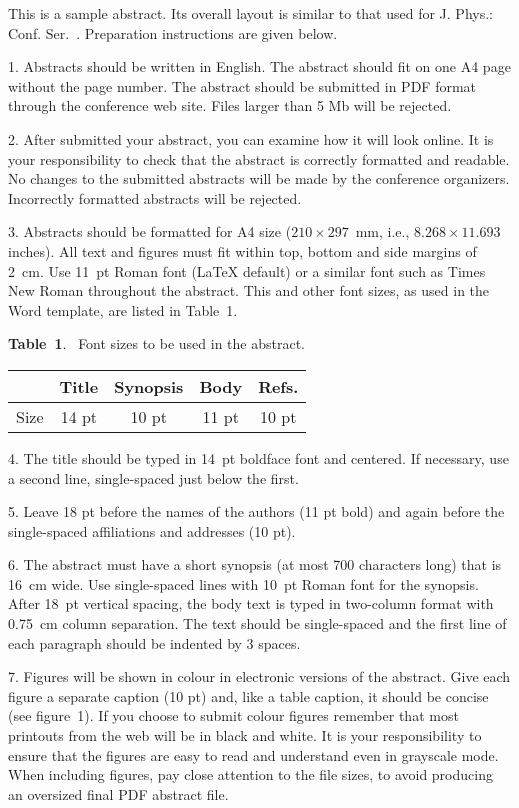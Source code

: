 \documentclass[a4paper,11pt]{article}
\newcommand{\abstracttext}[1]{
 \vspace*{-0.3cm}
 \columnsep0.75cm
 \begin{multicols}{2} #1 \end{multicols}
}
\newcommand{\captTab}[2]{
 \vspace*{-0.1cm}
 \begin{center}
 \begin{minipage}[t]{7.8cm} {\small {\bf Table~#1}.~ #2} \end{minipage}
 \end{center}
 \vspace*{0.1cm}
}
\begin{document}
\abstracttext{This is a sample abstract. Its overall
layout is similar to that used for J. Phys.: Conf. Ser.~\cite{diaz09}. 
Preparation instructions are given below.

1. Abstracts should be written in English. The abstract should fit on
one A4 page without the page number. The abstract should be submitted in PDF
format through the conference web site. Files larger than 5 Mb will be rejected.

2. After submitted your abstract, you can examine how it will look
online. It is your responsibility to check that the abstract is
correctly formatted and readable. No changes to the submitted
abstracts will be made by the conference organizers. Incorrectly
formatted abstracts will be rejected.

3. Abstracts should be formatted for A4 size ($210\times 297$~mm,
i.e., $8.268\times 11.693$ inches). All text and figures must fit
within top, bottom and side margins of 2~cm. Use 11~pt Roman font
(LaTeX default) or a similar font such as Times New Roman throughout
the abstract. This and other font sizes, as used in the Word
template, are listed in Table~1.




\begin{center}
\captTab{1}{Font sizes to be used in the abstract.}
\begin{tabular}[b]{lcccc}
\hline
   & Title & Synopsis & Body & Refs. \\
\hline
Size & 14 pt & 10 pt & 11 pt & 10 pt \\
\hline
\end{tabular}
\end{center}

4. The title should be typed in 14~pt boldface font and centered.
If necessary, use a second line, single-spaced just below the first.

5. Leave 18 pt before the names of the authors (11 pt bold) and again before
the single-spaced affiliations and addresses (10 pt).

6. The abstract must have a short synopsis (at most 700 characters long)
that is 16~cm wide. Use single-spaced lines with 10~pt Roman
font for the synopsis. After 18~pt vertical spacing, the body text is typed
in two-column format with 0.75~cm column separation. The text should be
single-spaced and the first line of each paragraph should be indented by
3 spaces.

7. Figures will be shown in colour in electronic versions of the abstract.
Give each figure a separate caption (10 pt) and, like a table caption, it
should be
concise (see figure~1). If you choose to submit colour figures remember that
most printouts from the web will be in black and white. It is your
responsibility to ensure that the figures are easy to read and understand
even in grayscale mode. When including figures, pay close attention to the
file sizes, to avoid producing an oversized final PDF abstract file.

}
\end{document}
